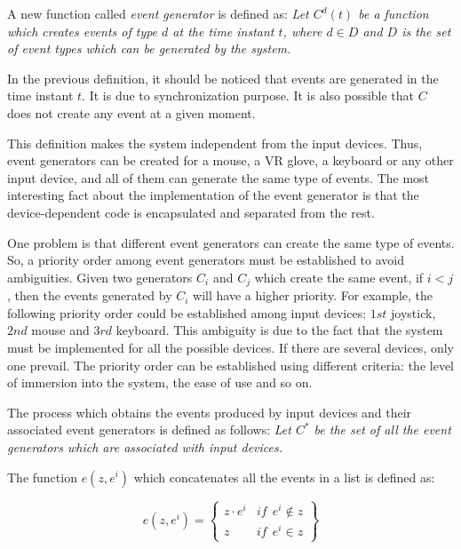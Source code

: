 \documentclass[10pt,journal,letterpaper,compsoc]{IEEEtran}
\begin{document}
A new function called \textit{event generator} is defined as:
{\itshape Let $C^d(t)$ be a function which creates events of type $d$ at the time instant $t$,
where $d \in D$ and $D$ is the set of event types which can be generated by the system.
}


In the previous definition, it should be noticed that events are generated in the time instant $t$.
It is due to synchronization purpose. It is also possible that $C$ does not create any event at a
given moment.

This definition makes the system independent from the input devices. Thus, event generators can be
created for a mouse, a VR glove, a keyboard or any other input device, and all of them can generate
the same type of events. The most interesting fact about the implementation of the event generator
is that the device-dependent code is encapsulated and separated from the rest.

One problem is that different event generators can create the same type of events. So, a priority
order among event generators must be established to avoid ambiguities. Given two generators $C_i$
and $C_j$ which create the same event, if $i < j$, then the events generated by $C_i$ will have a
higher priority. For example, the following priority order could be established among input
devices: $1st$ joystick, $2nd$ mouse and $3rd$ keyboard. This ambiguity is due to the fact that the
system must be implemented for all the possible devices. If there are several devices, only one
prevail. The priority order can be established using different criteria: the level of immersion
into the system, the ease of use and so on.

The process which obtains the events produced by input devices and their associated event
generators is defined as follows:
{\itshape Let $C^*$ be the set of all the event generators which are associated with input
devices.
}


The function $e(z, e^i)$ which concatenates all the events in a list is defined
as:

\begin{equation}
    e(z, e^i) = \left\{
    \begin{array}{ll}
        z \cdot e^i   &   \mathit{if} \ \ e^i \notin z \\
        z    &   \mathit{if} \ \ e^i \in z
    \end{array}
    \right\}
\end{equation}
\end{document}
